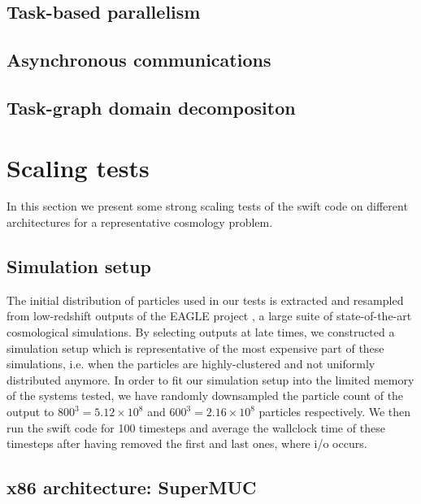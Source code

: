 \documentclass{sig-alternate-05-2015}
\newcommand{\swift}{{\sc swift}\xspace}
\begin{document}
\subsection{Task-based parallelism}

\subsection{Asynchronous communications}

\subsection{Task-graph domain decompositon}


\section{Scaling tests}

In this section we present some strong scaling tests of the \swift code on different
architectures for a representative cosmology problem.

\subsection{Simulation setup}

The initial distribution of particles used in our tests is extracted and
resampled from low-redshift outputs of the EAGLE project \cite{Schaye2015}, a
large suite of state-of-the-art cosmological simulations. By selecting outputs
at late times, we constructed a simulation setup which is representative of the
most expensive part of these simulations, i.e. when the particles are
highly-clustered and not uniformly distributed anymore. In order to fit our
simulation setup into the limited memory of the systems tested, we have randomly
downsampled the particle count of the output to $800^3=5.12\times10^8$ and
$600^3=2.16\times10^8$ particles respectively. We then run the \swift code for
100 timesteps and average the wallclock time of these timesteps after having
removed the first and last ones, where i/o occurs.


\subsection{x86 architecture: SuperMUC}
\end{document}
